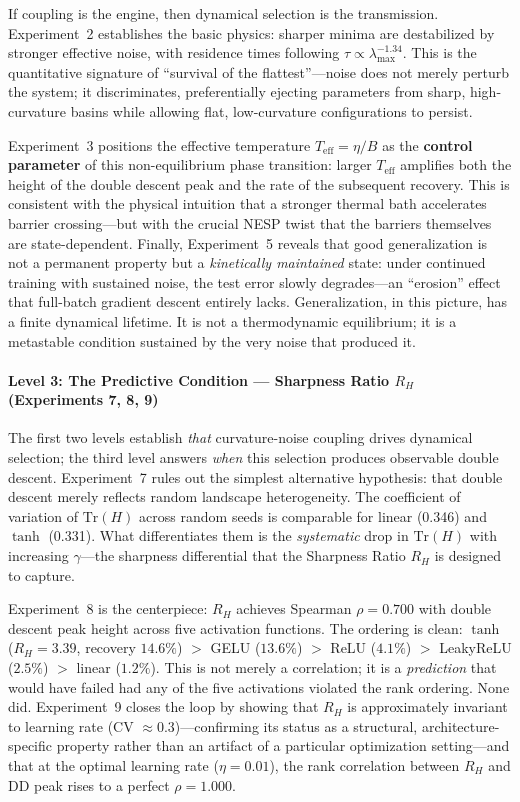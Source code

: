 \documentclass[
  journal=largetwo,
  simfonts=false,
  year=2025,
  volume=37,
]{cup-journal}
\begin{document}
If coupling is the engine, then dynamical selection is the transmission. Experiment~2 establishes the basic physics: sharper minima are destabilized by stronger effective noise, with residence times following $\tau \propto \lambda_{\max}^{-1.34}$. This is the quantitative signature of ``survival of the flattest''---noise does not merely perturb the system; it discriminates, preferentially ejecting parameters from sharp, high-curvature basins while allowing flat, low-curvature configurations to persist.

Experiment~3 positions the effective temperature $T_{\mathrm{eff}} = \eta/B$ as the \textbf{control parameter} of this non-equilibrium phase transition: larger $T_{\mathrm{eff}}$ amplifies both the height of the double descent peak and the rate of the subsequent recovery. This is consistent with the physical intuition that a stronger thermal bath accelerates barrier crossing---but with the crucial NESP twist that the barriers themselves are state-dependent. Finally, Experiment~5 reveals that good generalization is not a permanent property but a \textit{kinetically maintained} state: under continued training with sustained noise, the test error slowly degrades---an ``erosion'' effect that full-batch gradient descent entirely lacks. Generalization, in this picture, has a finite dynamical lifetime. It is not a thermodynamic equilibrium; it is a metastable condition sustained by the very noise that produced it.

\paragraph{Level 3: The Predictive Condition --- Sharpness Ratio $R_H$ (Experiments 7, 8, 9)}

The first two levels establish \textit{that} curvature-noise coupling drives dynamical selection; the third level answers \textit{when} this selection produces observable double descent. Experiment~7 rules out the simplest alternative hypothesis: that double descent merely reflects random landscape heterogeneity. The coefficient of variation of $\mathrm{Tr}(H)$ across random seeds is comparable for linear (0.346) and $\tanh$ (0.331). What differentiates them is the \textit{systematic} drop in $\mathrm{Tr}(H)$ with increasing $\gamma$---the sharpness differential that the Sharpness Ratio $R_H$ is designed to capture.

Experiment~8 is the centerpiece: $R_H$ achieves Spearman $\rho = 0.700$ with double descent peak height across five activation functions. The ordering is clean: $\tanh$ ($R_H = 3.39$, recovery $14.6\%$) $>$ GELU ($13.6\%$) $>$ ReLU ($4.1\%$) $>$ LeakyReLU ($2.5\%$) $>$ linear ($1.2\%$). This is not merely a correlation; it is a \textit{prediction} that would have failed had any of the five activations violated the rank ordering. None did. Experiment~9 closes the loop by showing that $R_H$ is approximately invariant to learning rate (CV $\approx 0.3$)---confirming its status as a structural, architecture-specific property rather than an artifact of a particular optimization setting---and that at the optimal learning rate ($\eta = 0.01$), the rank correlation between $R_H$ and DD peak rises to a perfect $\rho = 1.000$.
\end{document}
